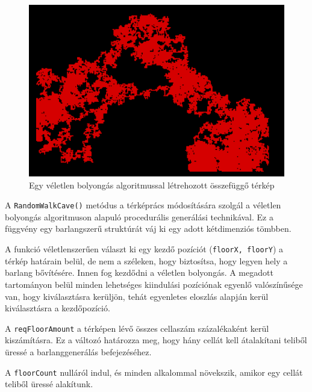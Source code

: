 \begin{figure}[ht]
\centering
\includegraphics[width =\textwidth]{images/randomwalkfigure.png}
\caption{Egy véletlen bolyongás algoritmussal létrehozott összefüggő térkép \cite{randomwalk}}
\label{fig:randomwalkfigure}
\end{figure}

\newpage
{}

A \texttt{RandomWalkCave()} metódus a térképrács módosítására szolgál a véletlen bolyongás algoritmuson alapuló procedurális generálási technikával. Ez a függvény egy barlangszerű struktúrát váj ki egy adott kétdimenziós tömbben.

A funkció véletlenszerűen választ ki egy kezdő pozíciót (\texttt{floorX, floorY}) a térkép határain belül, de nem a széleken, hogy biztosítsa, hogy legyen hely a barlang bővítésére. Innen fog kezdődni a véletlen bolyongás. A megadott tartományon belül minden lehetséges kiindulási pozíciónak egyenlő valószínűsége van, hogy kiválasztásra kerüljön, tehát egyenletes eloszlás alapján kerül kiválasztásra a kezdőpozíció.

A \texttt{reqFloorAmount} a térképen lévő összes cellaszám százalékaként kerül kiszámításra. Ez a változó határozza meg, hogy hány cellát kell átalakítani teliből üressé a barlanggenerálás befejezéséhez.

A \texttt{floorCount} nulláról indul, és minden alkalommal növekszik, amikor egy cellát teliből üressé alakítunk.

